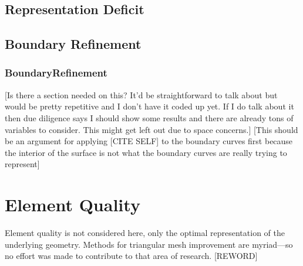 \subsection{Representation Deficit}



%


\subsection{Boundary Refinement}
\subsubsection{BoundaryRefinement}
[Is there a section needed on this? It'd be straightforward to talk about
but would be pretty repetitive and I don't have it coded up yet. If I do
talk about it then due diligence says I should show some results and
there are already tons of variables to consider. This might get left out
due to space concerns.]
[This should be an argument for applying [CITE SELF] to the boundary
curves first because the interior of the surface is not what the
boundary curves are really trying to represent]

\section{Element Quality}
Element quality is not considered here, only the optimal representation
of the underlying geometry. Methods for triangular mesh improvement are
myriad---so no effort was made to contribute to that area of research.
[REWORD]
